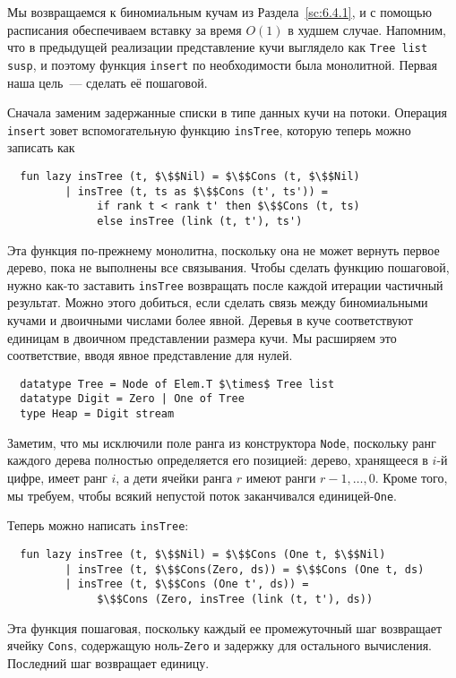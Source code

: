 Мы возвращаемся к биномиальным кучам из Раздела~\ref{sc:6.4.1}, и с
помощью расписания обеспечиваем вставку за время $O(1)$ в худшем
случае. Напомним, что в предыдущей реализации представление кучи
выглядело как \lstinline!Tree list susp!, и поэтому функция \lstinline!insert!
по необходимости была монолитной. Первая наша цель~--- сделать её
пошаговой.

Сначала заменим задержанные списки в типе данных кучи на
потоки. Операция \lstinline!insert! зовет вспомогательную функцию
\lstinline!insTree!, которую теперь можно записать как
\begin{lstlisting}
  fun lazy insTree (t, $\$$Nil) = $\$$Cons (t, $\$$Nil)
         | insTree (t, ts as $\$$Cons (t', ts')) =
              if rank t < rank t' then $\$$Cons (t, ts)
              else insTree (link (t, t'), ts')
\end{lstlisting}
Эта функция по-прежнему монолитна, поскольку она не может вернуть
первое дерево, пока не выполнены все связывания. Чтобы сделать функцию
пошаговой, нужно как-то заставить \lstinline!insTree! возвращать после
каждой итерации частичный результат. Можно этого добиться, если
сделать связь между биномиальными кучами и двоичными числами более
явной. Деревья в куче соответствуют единицам в двоичном представлении
размера кучи. Мы расширяем это соответствие, вводя явное представление
для нулей.
\begin{lstlisting}
  datatype Tree = Node of Elem.T $\times$ Tree list
  datatype Digit = Zero | One of Tree
  type Heap = Digit stream
\end{lstlisting}
Заметим, что мы исключили поле ранга из конструктора \lstinline!Node!,
поскольку ранг каждого дерева полностью определяется его позицией:
дерево, хранящееся в $i$-й цифре, имеет ранг $i$, а дети ячейки ранга
$r$ имеют ранги $r - 1,\ldots, 0$. Кроме того, мы требуем, чтобы
всякий непустой поток заканчивался единицей-\lstinline!One!.

Теперь можно написать \lstinline!insTree!:
\begin{lstlisting}
  fun lazy insTree (t, $\$$Nil) = $\$$Cons (One t, $\$$Nil)
         | insTree (t, $\$$Cons(Zero, ds)) = $\$$Cons (One t, ds)
         | insTree (t, $\$$Cons (One t', ds)) =
              $\$$Cons (Zero, insTree (link (t, t'), ds))
\end{lstlisting}
Эта функция пошаговая, поскольку каждый ее промежуточный шаг
возвращает ячейку \lstinline!Cons!, содержащую ноль-\lstinline!Zero! и
задержку для остального
вычисления. Последний шаг возвращает единицу.

